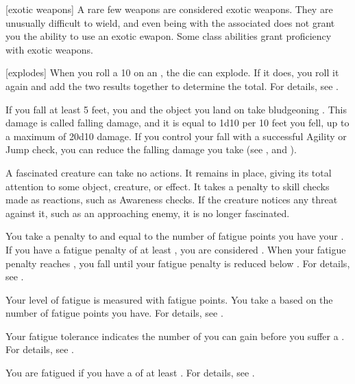 [exotic weapons] A rare few weapons are considered exotic weapons.
They are unusually difficult to wield, and even being  with the associated  does not grant you the ability to use an exotic ewapon.
Some class abilities grant proficiency with exotic weapons.

[explodes] When you roll a 10 on an , the die can explode.
If it does, you roll it again and add the two results together to determine the total.
For details, see .

 If you fall at least 5 feet, you and the object you land on take bludgeoning .
This damage is called falling damage, and it is equal to 1d10 per 10 feet you fell, up to a maximum of 20d10 damage.
If you control your fall with a successful Agility or Jump check, you can reduce the falling damage you take (see , and ).

 A fascinated creature can take no actions. It remains in place, giving its total attention to some object, creature, or effect. It takes a  penalty to skill checks made as reactions, such as Awareness checks.
If the creature notices any threat against it, such as an approaching enemy, it is no longer fascinated.

 You take a penalty to  and  equal to the number of fatigue points you have \sub your .
If you have a fatigue penalty of at least , you are considered .
When your fatigue penalty reaches , you fall  until your fatigue penalty is reduced below .
For details, see .

 Your level of fatigue is measured with fatigue points.
You take a  based on the number of fatigue points you have.
For details, see .

 Your fatigue tolerance indicates the number of  you can gain before you suffer a .
For details, see .

 You are fatigued if you have a  of at least .
For details, see .

